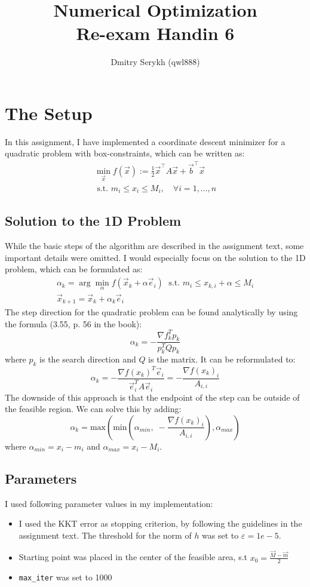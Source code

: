 \documentclass[a4paper]{article}
\title{\vspace{-5cm} Numerical Optimization \\ Re-exam Handin 6}
\author{Dmitry Serykh (qwl888)}
\begin{document}
\maketitle
\section{The Setup}
In this assignment, I have implemented a coordinate descent minimizer for a quadratic problem with
box-constraints, which can be written as:
\[
\begin{array}{l}
  \min _{\vec{x}} f(\vec{x}):=\frac{1}{2} \vec{x}^{\top} A \vec{x}+\vec{b}^{\top} \vec{x} \\
  \text { s.t. } m_{i} \leq x_{i} \leq M_{i}, \quad \forall i=1, \ldots, n
\end{array}
\]

\subsection{Solution to the 1D Problem}
While the basic steps of the algorithm are described in the assignment text,
some important details were omitted. I would especially focus on the solution to
the 1D problem, which can be formulated as:
\[
\begin{array}{l}
\alpha_k = \arg \min_\alpha f(\vec x_k + \alpha \vec e_i)\; \text{ s.t. }m_i\leq x_{k,i} + \alpha \leq M_i\\
\vec x_{k+1} =\vec x_k + \alpha_k \vec e_i
\end{array}
\]
The step direction for the quadratic problem can be found analytically by using
the formula (3.55, p. 56 in the book):
\[
\alpha_{k}=-\frac{\nabla f_{k}^{T} p_{k}}{p_{k}^{T} Q p_{k}}
\]
where $p_k$ is the search direction and $Q$ is the matrix. It can be
reformulated to:
\[
\alpha_{k}=-\frac{\nabla f(x_k)^{T} \vec{e}_{i}}{\vec{e}_{i}^{T} A \vec{e}_i}= -\frac{\nabla f(x_k)_i}{A_{i,i}}
\]
The downside of this approach is that the endpoint of the step can be outside of
the feasible region. We can solve this by adding:
\[
\alpha_{k}=\text{max}\left(\text{min}\left(\alpha_{min},\; -\frac{\nabla f(x_k)_i}{A_{i,i}}\right), \alpha_{max}\right)
\]
where $\alpha_{min} = x_i - m_i$ and $\alpha_{max} = x_i - M_i$.

\subsection{Parameters}
I used following parameter values in my implementation:
\begin{itemize}
\item I used the KKT error as stopping criterion, by following the guidelines in
  the assignment text. The threshold for the norm of $h$ was set to $\varepsilon = 1e-5$.
\item Starting point was placed in the center of the feasible area, s.t
  $x_0 = \frac{\vec{M} - \vec{m}}{2}$
\item \texttt{max\_iter} was set to 1000
\end{itemize}
\end{document}
